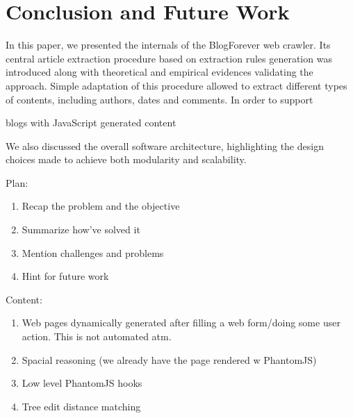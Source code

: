 \section{Conclusion and Future Work}
In this paper, we presented the internals of the BlogForever web crawler. Its central article extraction procedure based on extraction rules generation was introduced along with theoretical and empirical evidences validating the approach. Simple adaptation of this procedure allowed to extract different types of contents, including authors, dates and comments. In order to support 

blogs with JavaScript generated content 

We also discussed the overall software architecture, highlighting the design choices made to achieve both modularity and scalability. 



Plan:
\begin{enumerate}
  \item Recap the problem and the objective
  \item Summarize how've solved it
  \item Mention challenges and problems
  \item Hint for future work
\end{enumerate}

Content:
\begin{enumerate}
  \item Web pages dynamically generated after filling a web form/doing some user action. This is not automated atm.
  \item Spacial reasoning (we already have the page rendered w PhantomJS)
  \item Low level PhantomJS hooks
  \item Tree edit distance matching
\end{enumerate}
